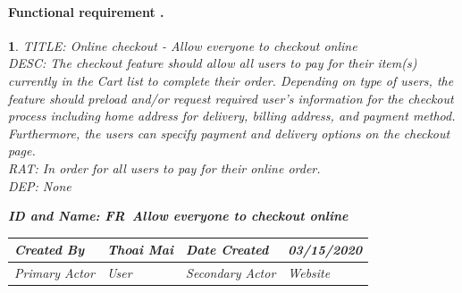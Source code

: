 \documentclass{scrreprt}
\theoremstyle{funreq}
\newtheorem{funreq}{}
\begin{document}
	\paragraph[]{Functional requirement .}
	\begin{funreq}
		\label{online_checkout}
		TITLE: Online checkout - Allow everyone to checkout online\\
		DESC: The checkout feature should allow all users to pay for their item(s) currently in the Cart list to complete their order. Depending on type of users, the feature should preload and/or request required user’s information for the checkout process including home address for delivery, billing address, and payment method. Furthermore, the users can specify payment and delivery options on the checkout page.\\
		RAT: In order for all users to pay for their online order.\\
		DEP: None\\
		
		\begin{table}[H]
			\begin{flushleft}\bfseries{ID and Name: FR\thefunreq ~\hspace{.6cm}Allow everyone to checkout online}\end{flushleft}
			\begin{tabularx}{\columnwidth}{|X|X|X|X|}
				\hline
				Created By    & Thoai Mai & Date Created    & 03/15/2020 \\ \hline
				Primary Actor & User        & Secondary Actor & Website \\ \hline
			\end{tabularx}
		
\end{table}
\end{funreq}
\end{document}
